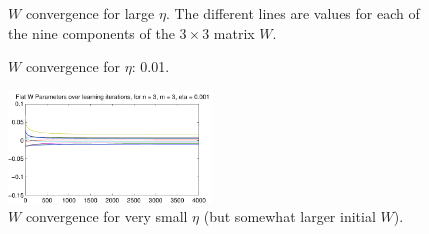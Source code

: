 \documentclass[11pt]{report}
\begin{document}
\begin{figure}[H]
  \centering
  \caption{$W$ convergence for large $\eta$. The different lines are values for each of the nine components of the $3 \times 3$ matrix $W$.}
  \label{fig:eta5}
\end{figure}

\begin{figure}[H]
  \centering
  \caption{$W$ convergence for $\eta$: 0.01.}
  \label{fig:eta01}
\end{figure}

\begin{figure}[H]
  \centering
  \includegraphics[width=0.48\textwidth]{../plots/learning-eta-001.pdf}
  \caption{$W$ convergence for very small $\eta$ (but somewhat larger initial $W$).}
  \label{fig:eta001}
\end{figure}
\end{document}
